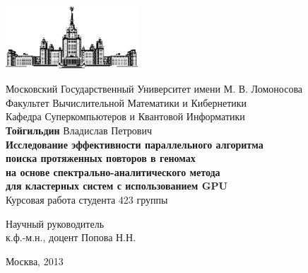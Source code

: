 \begin{titlepage}
\begin{center}

    \includegraphics[width=50mm]{image/msu4.eps}

    \bigskip
    Московский Государственный Университет имени М. В. Ломоносова\\
    Факультет Вычислительной Математики и Кибернетики\\

    \bigskip
    Кафедра Суперкомпьютеров и Квантовой Информатики\\[10mm]

    \large
    {{\bf Тойгильдин} Владислав Петрович\\}
    \bigskip
    \Large
    {\bf{Исследование эффективности параллельного алгоритма \\
        поиска протяженных повторов в геномах \\
        на основе спектрально-аналитического метода \\
        для кластерных систем с использованием GPU \\}
    }
    \normalsize
    \bigskip
    Курсовая работа
    студента 423 группы
    \bigskip
    \begin{flushright}
        Научный руководитель\\
        к.ф.-м.н., доцент Попова Н.Н.
    \end{flushright}
    \bigskip
    Москва, 2013
\end{center}
\end{titlepage}
\setcounter{page}{2}

